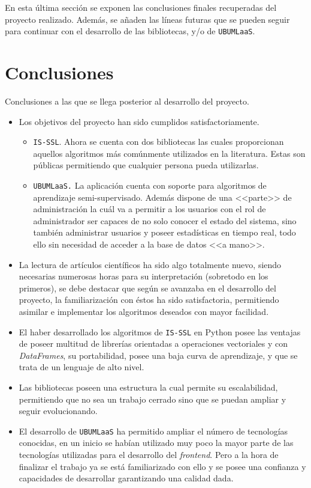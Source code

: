 
En esta última sección se exponen las conclusiones finales recuperadas del proyecto realizado. Además, se añaden las líneas futuras que se pueden seguir para continuar con el desarrollo de las bibliotecas, y/o de \texttt{UBUMLaaS}.

\section{Conclusiones}
Conclusiones a las que se llega posterior al desarrollo del proyecto.

\begin{itemize}
\item Los objetivos del proyecto han sido cumplidos satisfactoriamente.
	\begin{itemize}
	\item \texttt{IS-SSL}. Ahora se cuenta con dos bibliotecas las cuales proporcionan aquellos algoritmos más comúnmente utilizados en la literatura. Estas son públicas permitiendo que cualquier persona pueda utilizarlas.
	\item \texttt{UBUMLaaS.} La aplicación cuenta con soporte para algoritmos de aprendizaje semi-supervisado. Además dispone de una <<parte>> de administración la cuál va a permitir a los usuarios con el rol de administrador ser capaces de no solo conocer el estado del sistema, sino también administrar usuarios y poseer estadísticas en tiempo real, todo ello sin necesidad de acceder a la base de datos <<a mano>>.
	\end{itemize}
\item La lectura de artículos científicos ha sido algo totalmente nuevo, siendo necesarias numerosas horas para su interpretación (sobretodo en los primeros), se debe destacar que según se avanzaba en el desarrollo del proyecto, la familiarización con éstos ha sido satisfactoria, permitiendo asimilar e implementar los algoritmos deseados con mayor facilidad.
\item El haber desarrollado los algoritmos de \texttt{IS-SSL} en Python posee las ventajas de poseer multitud de librerías orientadas a operaciones vectoriales y con \textit{DataFrames}, su portabilidad, posee una baja curva de aprendizaje, y que se trata de un lenguaje de alto nivel.
\item Las bibliotecas poseen una estructura la cual permite su escalabilidad, permitiendo que no sea un trabajo cerrado sino que se puedan ampliar y seguir evolucionando.
\item El desarrollo de \texttt{UBUMLaaS} ha permitido ampliar el número de tecnologías conocidas, en un inicio se habían utilizado muy poco la mayor parte de las tecnologías utilizadas para el desarrollo del \textit{frontend}. Pero a la hora de finalizar el trabajo ya se está familiarizado con ello y se posee una confianza y capacidades de desarrollar garantizando una calidad dada.

\end{itemize}
